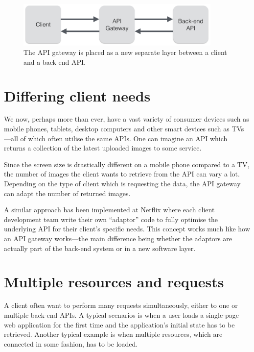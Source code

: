\documentclass{cslthse-msc}
\begin{document}
\begin{figure}[H]
  \centering
    \begin{center}
      \includegraphics[width=0.9\textwidth]{images/api_gateway.png}
    \end{center}
  \caption{The API gateway is placed as a new separate layer between a client and a back-end API.}
\end{figure}

\section{Differing client needs}
We now, perhaps more than ever, have a vast variety of consumer devices such as mobile phones, tablets, desktop computers and other smart devices such as TVs---all of which often utilise the same APIs. One can imagine an API which returns a collection of the latest uploaded images to some service. 

Since the screen size is drastically different on a mobile phone compared to a TV, the number of images the client wants to retrieve from the API can vary a lot. Depending on the type of client which is requesting the data, the API gateway can adapt the number of returned images.

A similar approach has been implemented at Netflix where each client development team write their own \enquote{adaptor} code to fully optimise the underlying API for their client's specific needs\cite{netflix}. This concept works much like how an API gateway works---the main difference being whether the adaptors are actually part of the back-end system or in a new software layer.

\section{Multiple resources and requests}
A client often want to perform many requests simultaneously, either to one or multiple back-end APIs. A typical scenarios is when a user loads a single-page web application for the first time and the application's initial state has to be retrieved. Another typical example is when multiple resources, which are connected in some fashion, has to be loaded.
\end{document}
